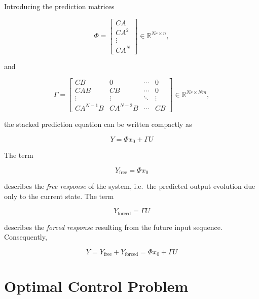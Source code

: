 Introducing the prediction matrices

\begin{equation}
    \Phi =
    \begin{bmatrix}
        CA \\
        CA^2 \\
        \vdots \\
        CA^N
    \end{bmatrix}
    \in \mathbb{R}^{Nr \times n},
    \label{eq:lti_phi}
\end{equation}

and

\begin{equation}
    \Gamma =
    \begin{bmatrix}
        CB & 0 & \cdots & 0 \\
        CAB & CB & \cdots & 0 \\
        \vdots & \vdots & \ddots & \vdots \\
        CA^{N-1}B & CA^{N-2}B & \cdots & CB
    \end{bmatrix}
    \in \mathbb{R}^{Nr \times Nm},
    \label{eq:lti_gamma}
\end{equation}

the stacked prediction equation can be written compactly as

\begin{equation}
    \boxed{
        Y = \Phi x_0 + \Gamma U
    }
    \label{eq:lti_stacked}
\end{equation}

The term

\begin{equation}
    Y_{\mathrm{free}} = \Phi x_0
\end{equation}

describes the \emph{free response} of the system, i.e.\ the predicted output evolution due only to the current state. The term

\begin{equation}
    Y_{\mathrm{forced}} = \Gamma U
\end{equation}

describes the \emph{forced response} resulting from the future input sequence. Consequently,

\begin{equation}
    Y
    =
    Y_{\mathrm{free}}
    +
    Y_{\mathrm{forced}}
    =
    \Phi x_0 + \Gamma U
\end{equation}

\section{Optimal Control Problem}

